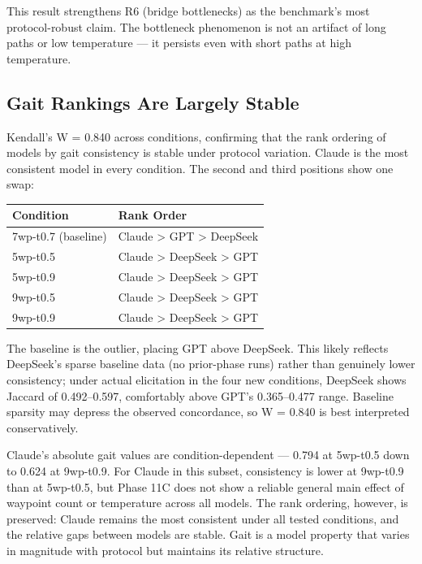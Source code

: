 This result strengthens R6 (bridge bottlenecks) as the benchmark's most protocol-robust claim. The bottleneck phenomenon is not an artifact of long paths or low temperature --- it persists even with short paths at high temperature.

\subsection{Gait Rankings Are Largely Stable}\label{gait-rankings-are-largely-stable}

Kendall's W = 0.840 across conditions, confirming that the rank ordering of models by gait consistency is stable under protocol variation. Claude is the most consistent model in every condition. The second and third positions show one swap:

\begin{longtable}[]{@{}ll@{}}
\toprule\noalign{}
Condition & Rank Order \\
\midrule\noalign{}
\endhead
\bottomrule\noalign{}
\endlastfoot
7wp-t0.7 (baseline) & Claude \textgreater{} GPT \textgreater{} DeepSeek \\
5wp-t0.5 & Claude \textgreater{} DeepSeek \textgreater{} GPT \\
5wp-t0.9 & Claude \textgreater{} DeepSeek \textgreater{} GPT \\
9wp-t0.5 & Claude \textgreater{} DeepSeek \textgreater{} GPT \\
9wp-t0.9 & Claude \textgreater{} DeepSeek \textgreater{} GPT \\
\end{longtable}

The baseline is the outlier, placing GPT above DeepSeek. This likely reflects DeepSeek's sparse baseline data (no prior-phase runs) rather than genuinely lower consistency; under actual elicitation in the four new conditions, DeepSeek shows Jaccard of 0.492--0.597, comfortably above GPT's 0.365--0.477 range. Baseline sparsity may depress the observed concordance, so W = 0.840 is best interpreted conservatively.

Claude's absolute gait values are condition-dependent --- 0.794 at 5wp-t0.5 down to 0.624 at 9wp-t0.9. For Claude in this subset, consistency is lower at 9wp-t0.9 than at 5wp-t0.5, but Phase 11C does not show a reliable general main effect of waypoint count or temperature across all models. The rank ordering, however, is preserved: Claude remains the most consistent under all tested conditions, and the relative gaps between models are stable. Gait is a model property that varies in magnitude with protocol but maintains its relative structure.

